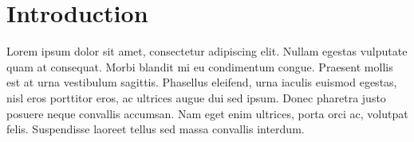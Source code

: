 \documentclass[../thesis.tex]{subfiles}
\begin{document}
\chapter{Introduction}

Lorem ipsum dolor sit amet, consectetur adipiscing elit. Nullam egestas vulputate quam at consequat. Morbi blandit mi eu condimentum congue. Praesent mollis est at urna vestibulum sagittis. Phasellus eleifend, urna iaculis euismod egestas, nisl eros porttitor eros, ac ultrices augue dui sed ipsum. Donec pharetra justo posuere neque convallis accumsan. Nam eget enim ultrices, porta orci ac, volutpat felis. Suspendisse laoreet tellus sed massa convallis interdum.
\end{document}
